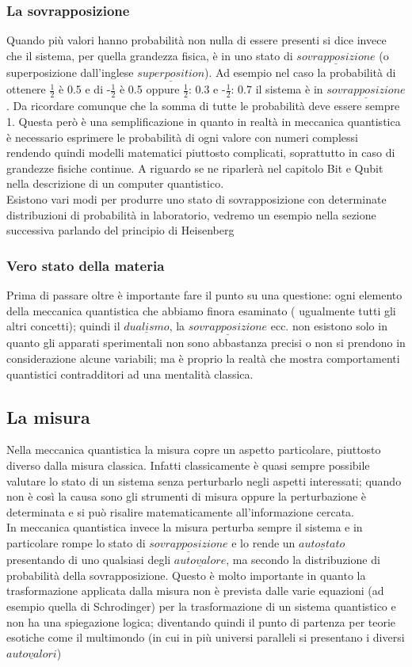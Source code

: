 \subsubsection{La sovrapposizione}
Quando più valori hanno probabilità non nulla di essere presenti si dice invece che il sistema, per quella grandezza fisica, è in uno stato di $\underline{sovrapposizione}$ (o superposizione dall'inglese $\underline{superposition}$). Ad esempio nel caso la probabilità di ottenere $\frac{1}{2}$ è 0.5 e di -$\frac{1}{2}$ è 0.5 oppure $\frac{1}{2}$: 0.3 e -$\frac{1}{2}$: 0.7 il sistema è in $\underline{sovrapposizione}$. Da ricordare comunque che la somma di tutte le probabilità deve essere sempre 1. Questa però è una semplificazione in quanto in realtà in meccanica quantistica è necessario esprimere le probabilità di ogni valore con numeri complessi rendendo quindi modelli matematici piuttosto complicati, soprattutto in caso di grandezze fisiche continue. A riguardo se ne riparlerà nel capitolo Bit e Qubit nella descrizione di un computer quantistico.\\
Esistono vari modi per produrre uno stato di sovrapposizione con determinate distribuzioni di probabilità in laboratorio, vedremo un esempio nella sezione successiva parlando del principio di Heisenberg
\subsubsection{Vero stato della materia}
Prima di passare oltre è importante fare il punto su una questione:
ogni elemento della meccanica quantistica che abbiamo finora esaminato ( ugualmente tutti gli altri concetti); quindi il $\underline{dualismo}$, la $\underline{sovrapposizione}$ ecc. non esistono solo in quanto gli apparati sperimentali non sono abbastanza precisi o non si prendono in considerazione alcune variabili; ma è proprio la realtà che mostra comportamenti quantistici contradditori ad una mentalità classica.
\subsection{La misura}
Nella meccanica quantistica la misura copre un aspetto particolare, piuttosto diverso dalla misura classica.
Infatti classicamente è quasi sempre possibile valutare lo stato di un sistema senza perturbarlo negli aspetti interessati; quando non è così la causa sono gli strumenti di misura oppure la perturbazione è determinata e si può risalire matematicamente all'informazione cercata.\\
In meccanica quantistica invece la misura perturba sempre il sistema e in particolare rompe lo stato di $\underline{sovrapposizione}$ e lo rende un $\underline{autostato}$ presentando di uno qualsiasi degli $\underline{autovalore}$, ma secondo la distribuzione di probabilità della sovrapposizione.
Questo è molto importante in quanto la trasformazione applicata dalla misura non è prevista dalle varie equazioni (ad esempio quella di Schrodinger) per la trasformazione di un sistema quantistico e non ha una spiegazione logica; diventando quindi il punto di partenza per teorie esotiche come il multimondo (in cui in più universi paralleli si presentano i diversi $\underline{autovalori}$)
